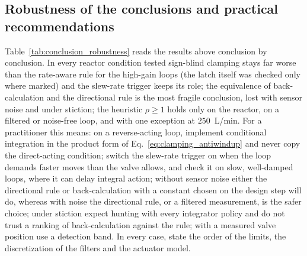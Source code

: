 \subsection{Robustness of the conclusions and practical recommendations}
\label{subsec:robustness_summary}
Table~\ref{tab:conclusion_robustness} reads the results above conclusion by conclusion. In every reactor condition tested sign-blind clamping stays far worse than the rate-aware rule for the high-gain loops (the latch itself was checked only where marked) and the slew-rate trigger keeps its role; the equivalence of back-calculation and the directional rule is the most fragile conclusion, lost with sensor noise and under stiction; the heuristic $\rho \ge 1$ holds only on the reactor, on a filtered or noise-free loop, and with one exception at $250$~L/min. For a practitioner this means: on a reverse-acting loop, implement conditional integration in the product form of Eq.~\eqref{eq:clamping_antiwindup} and never copy the direct-acting condition; switch the slew-rate trigger on when the loop demands faster moves than the valve allows, and check it on slow, well-damped loops, where it can delay integral action; without sensor noise either the directional rule or back-calculation with a constant chosen on the design step will do, whereas with noise the directional rule, or a filtered measurement, is the safer choice; under stiction expect hunting with every integrator policy and do not trust a ranking of back-calculation against the rule; with a measured valve position use a detection band. In every case, state the order of the limits, the discretization of the filters and the actuator model.




